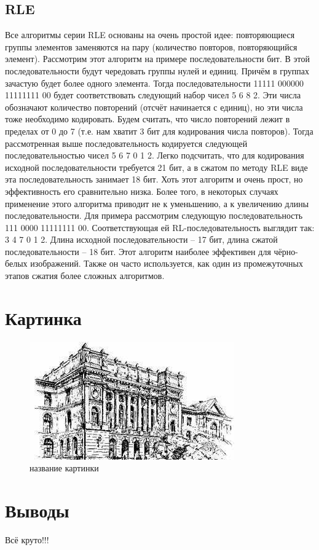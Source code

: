 \subsection*{RLE}
Все алгоритмы серии RLE основаны на очень простой идее: повторяющиеся группы элементов заменяются на пару (количество повторов, повторяющийся элемент). Рассмотрим этот алгоритм на примере последовательности бит. В этой последовательности будут чередовать группы нулей и единиц. Причём в группах зачастую будет более одного элемента. Тогда последовательности 11111 000000 11111111 00 будет соответствовать следующий набор чисел 5 6 8 2. Эти числа обозначают количество повторений (отсчёт начинается с единиц), но эти числа тоже необходимо кодировать. Будем считать, что число повторений лежит в пределах от 0 до 7 (т.е. нам хватит 3 бит для кодирования числа повторов). Тогда рассмотренная выше последовательность кодируется следующей последовательностью чисел 5 6 7 0 1 2. Легко подсчитать, что для кодирования исходной последовательности требуется 21 бит, а в сжатом по методу RLE виде эта последовательность занимает 18 бит.
Хоть этот алгоритм и очень прост, но эффективность его сравнительно низка. Более того, в некоторых случаях применение этого алгоритма приводит не к уменьшению, а к увеличению длины последовательности. Для примера рассмотрим следующую последовательность 111 0000 11111111 00. Соответствующая ей RL-последовательность выглядит так: 3 4 7 0 1 2. Длина исходной последовательности – 17 бит, длина сжатой последовательности – 18 бит.
Этот алгоритм наиболее эффективен для чёрно-белых изображений. Также он часто используется, как один из промежуточных этапов сжатия более сложных алгоритмов.
\section*{Картинка}

\begin{figure}[H]
	\begin{center}
		\includegraphics[scale=0.7]{pics/spbpu.jpg}
		\caption{название картинки} 
		\label{pic:pic_name} %
	\end{center}
\end{figure}

\section*{Выводы}
Всё круто!!!


